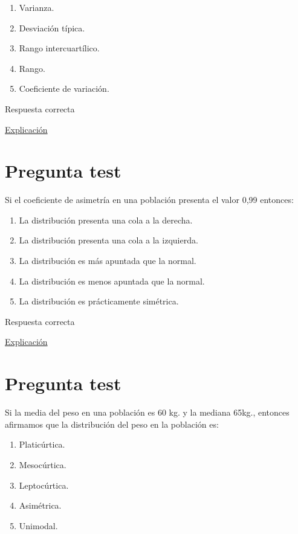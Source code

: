 \documentclass[
]{book}
\providecommand{\tightlist}{%
  \setlength{\itemsep}{0pt}\setlength{\parskip}{0pt}}
\begin{document}
\begin{enumerate}
\def\labelenumi{\alph{enumi})}
\tightlist
\item
  Varianza.
\item
  Desviación típica.
\item
  Rango intercuartílico.
\item
  Rango.
\item
  Coeficiente de variación.
\end{enumerate}

Respuesta correcta

\href{https://en.wikipedia.org/wiki/Coefficient_of_variation}{Explicación}

\hypertarget{pregunta-test-79}{%
\section{Pregunta test}\label{pregunta-test-79}}

Si el coeficiente de asimetría en una población presenta el valor 0,99 entonces:

\begin{enumerate}
\def\labelenumi{\alph{enumi})}
\tightlist
\item
  La distribución presenta una cola a la derecha.
\item
  La distribución presenta una cola a la izquierda.
\item
  La distribución es más apuntada que la normal.
\item
  La distribución es menos apuntada que la normal.
\item
  La distribución es prácticamente simétrica.
\end{enumerate}

Respuesta correcta

\href{https://1fjmanzano.github.io/bioestadistica/medidas-de-forma.html}{Explicación}

\hypertarget{pregunta-test-80}{%
\section{Pregunta test}\label{pregunta-test-80}}

Si la media del peso en una población es 60 kg. y la mediana 65kg., entonces afirmamos que la distribución del peso en la población es:

\begin{enumerate}
\def\labelenumi{\alph{enumi})}
\tightlist
\item
  Platicúrtica.
\item
  Mesocúrtica.
\item
  Leptocúrtica.
\item
  Asimétrica.
\item
  Unimodal.
\end{enumerate}
\end{document}
